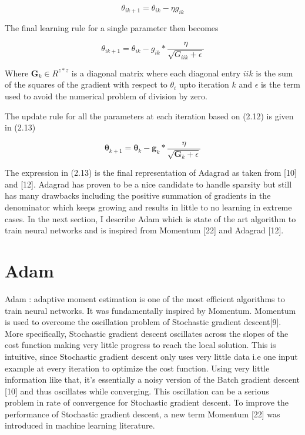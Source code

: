 \begin{equation}
\theta_{ik+1} = \theta_{ik} - \eta  g_{ik}
\end{equation}  

The final learning rule for a single parameter then becomes

\begin{equation}
\theta_{ik+1} = \theta_{ik} -  g_{ik} *  \frac{\eta}{\sqrt{G_{iik} + \epsilon}} 
\end{equation}

Where $\textbf{G}_k \in R^{z*z}$ is a diagonal matrix where each diagonal entry $iik$ is the sum of the squares of the gradient with respect to  $\theta_i$ upto iteration $k$ and $\epsilon$ is the term used to avoid the numerical problem of division by zero.  

The update rule for all the parameters at each iteration based on (2.12) is given in (2.13)

\begin{equation}
\bm{\theta}_{k+1} = \bm{\theta}_{k} -  \textbf{g}_{k} *  \frac{\eta}{\sqrt{\textbf{G}_{k} + \epsilon}} 
\end{equation}

The expression in (2.13) is the final representation of Adagrad as taken from [10] and [12]. Adagrad has proven to be a nice candidate to handle sparsity but still has many drawbacks including the positive summation of gradients in the denominator which keeps growing and results in little to no learning in extreme cases. In the next section, I describe Adam which is state of the art algorithm to train neural networks and is inspired from Momentum [22] and Adagrad [12].

\section {Adam}

Adam : adaptive moment estimation is one of the most efficient algorithms to train neural networks. It was fundamentally inspired by Momentum. Momentum is used to overcome the oscillation problem of Stochastic gradient descent[9]. More specifically, Stochastic gradient descent oscillates across the slopes of the cost function making very little progress to reach the local solution. This is intuitive, since Stochastic gradient descent only uses very little data i.e one input example at every iteration to optimize the cost function. Using very little information like that, it's essentially a noisy version of the Batch gradient descent [10] and thus oscillates while converging. This oscillation can be a serious problem in rate of convergence for Stochastic gradient descent. To improve the performance of Stochastic gradient descent, a new term Momentum [22] was introduced in machine learning literature. 

